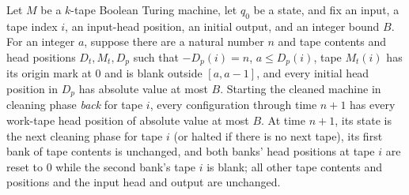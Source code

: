 \begin{lemma}
\label{Complexity.LogProg.back_run}
\leanok
{}
Let $M$ be a $k$-tape Boolean Turing machine, let $q_0$ be a state, and fix an input, a
tape index $i$, an input-head position, an initial output, and an integer bound $B$. For
an integer $a$, suppose there are a natural number $n$ and tape contents and head
positions $D_t,M_t,D_p$ such that $-D_p(i)=n$, $a\le D_p(i)$, tape $M_t(i)$ has its
origin mark at $0$ and is blank outside $[a,a-1]$, and every initial head position in
$D_p$ has absolute value at most $B$. Starting the cleaned machine in cleaning phase
\emph{back} for tape $i$, every configuration through time $n+1$ has every work-tape
head position of absolute value at most $B$. At time $n+1$, its state is the next
cleaning phase for tape $i$ (or halted if there is no next tape), its first bank of tape
contents is unchanged, and both banks' head positions at tape $i$ are reset to $0$ while
the second bank's tape $i$ is blank; all other tape contents and positions and the input
head and output are unchanged.
\end{lemma}

